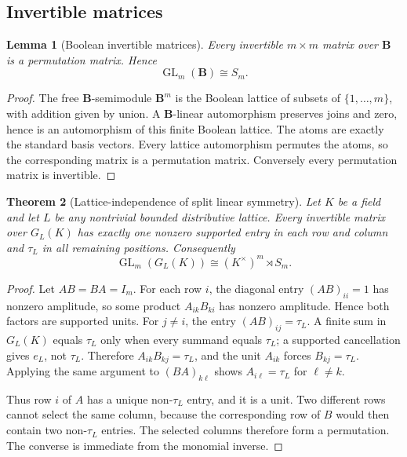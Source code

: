 \documentclass[11pt]{amsart}
\numberwithin{equation}{section}
\newtheorem{theorem}{Theorem}[section]
\newtheorem{lemma}[theorem]{Lemma}
\theoremstyle{definition}
\newcommand{\B}{\mathbf B}
\newcommand{\GL}{\operatorname{GL}}
\begin{document}
\subsection{Invertible matrices}

\begin{lemma}[Boolean invertible matrices]\label{lem:boolean-gl}
Every invertible $m\times m$ matrix over $\B$ is a permutation matrix.  Hence
\[
\GL_m(\B)\cong S_m.
\]
\end{lemma}

\begin{proof}
The free $\B$-semimodule $\B^m$ is the Boolean lattice of subsets of $\{1,\dots,m\}$, with addition given by union.  A $\B$-linear automorphism preserves joins and zero, hence is an automorphism of this finite Boolean lattice.  The atoms are exactly the standard basis vectors.  Every lattice automorphism permutes the atoms, so the corresponding matrix is a permutation matrix.  Conversely every permutation matrix is invertible.
\end{proof}


\begin{theorem}[Lattice-independence of split linear symmetry]
\label{thm:lattice-monomial-gl}
Let $K$ be a field and let $L$ be any nontrivial bounded distributive
lattice.  Every invertible matrix over $G_L(K)$ has exactly one nonzero
supported entry in each row and column and $\tau_L$ in all remaining
positions.  Consequently
\[
\boxed{
\GL_m(G_L(K))\cong(K^\times)^m\rtimes S_m.
}
\]
\end{theorem}

\begin{proof}
Let $A B=B A=I_m$.  For each row $i$, the diagonal entry
$(AB)_{ii}=1$ has nonzero amplitude, so some product
$A_{ik}B_{ki}$ has nonzero amplitude.  Hence both factors are supported
units.  For $j\neq i$, the entry $(AB)_{ij}=\tau_L$.  A finite sum in
$G_L(K)$ equals $\tau_L$ only when every summand equals $\tau_L$; a
supported cancellation gives $e_L$, not $\tau_L$.  Therefore
$A_{ik}B_{kj}=\tau_L$, and the unit $A_{ik}$ forces
$B_{kj}=\tau_L$.  Applying the same argument to $(BA)_{k\ell}$ shows
$A_{i\ell}=\tau_L$ for $\ell\neq k$.

Thus row $i$ of $A$ has a unique non-$\tau_L$ entry, and it is a unit.
Two different rows cannot select the same column, because the corresponding
row of $B$ would then contain two non-$\tau_L$ entries.  The selected
columns therefore form a permutation.  The converse is immediate from the
monomial inverse.
\end{proof}
\end{document}
